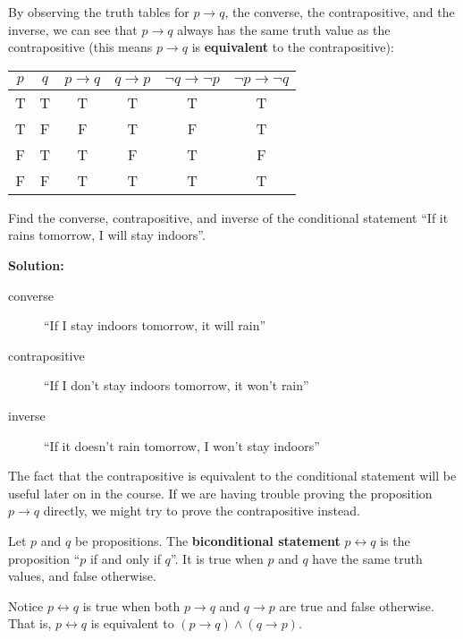 By observing the truth tables for $p\rightarrow q$, the converse, the
contrapositive, and the inverse, we can see that $p\rightarrow q$ always
has the same truth value as the contrapositive (this means $p\rightarrow q$
is \textbf{equivalent} to the contrapositive):

\begin{table}[h] \centering
  \begin{tabular}{|c|c|c|c|c|c|}\hline
    $p$ & $q$ & $p\rightarrow q$ & $q\rightarrow p$
    & $\neg q\rightarrow\neg p$ & $\neg p\rightarrow\neg q$ \\ \hline
    T & T & T & T & T & T \\\hline
    T & F & F & T & F & T \\\hline
    F & T & T & F & T & F \\\hline
    F & F & T & T & T & T \\\hline
  \end{tabular}
\end{table}

\example Find the converse, contrapositive, and inverse of the
conditional statement ``If it rains tomorrow, I will stay indoors''.

\vspace{0cm}
\textbf{Solution:}
\begin{description}
    \item[converse] ``If I stay indoors tomorrow, it will rain''
    \item[contrapositive] ``If I don't stay indoors tomorrow, it won't rain''
    \item[inverse] ``If it doesn't rain tomorrow, I won't stay indoors''
\end{description}


The fact that the contrapositive is equivalent to the conditional
statement will be useful later on in the course. If we are having
trouble proving the proposition $p\rightarrow q$ directly, we might
try to prove the contrapositive instead.

\begin{defn}
  Let $p$ and $q$ be propositions. The \textbf{biconditional statement}
  $p\leftrightarrow q$ is the proposition ``$p$ if and only if $q$''. It is
  true when $p$ and $q$ have the same truth values, and false otherwise.
\end{defn}

Notice $p\leftrightarrow q$ is true when both $p\rightarrow q$ and
$q\rightarrow p$ are true and false otherwise. That is,
$p\leftrightarrow q$ is equivalent to
$(p\rightarrow q)\wedge(q\rightarrow p)$.

